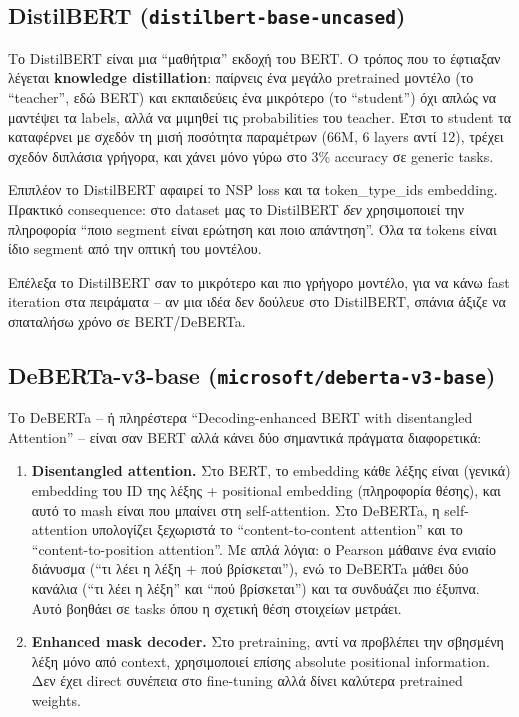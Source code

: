 \documentclass[12pt]{fphw}
\begin{document}
\subsection{DistilBERT (\texttt{distilbert-base-uncased})}

Το DistilBERT \cite{sanh2019distilbert} είναι μια ``μαθήτρια'' εκδοχή του BERT. Ο τρόπος που το έφτιαξαν λέγεται \textbf{knowledge distillation}: παίρνεις ένα μεγάλο pretrained μοντέλο (το ``teacher'', εδώ BERT) και εκπαιδεύεις ένα μικρότερο (το ``student'') όχι απλώς να μαντέψει τα labels, αλλά να μιμηθεί τις probabilities του teacher. Έτσι το student τα καταφέρνει με σχεδόν τη μισή ποσότητα παραμέτρων (66M, 6 layers αντί 12), τρέχει σχεδόν διπλάσια γρήγορα, και χάνει μόνο γύρω στο 3\% accuracy σε generic tasks.

Επιπλέον το DistilBERT αφαιρεί το NSP loss και τα token\_type\_ids embedding. Πρακτικό consequence: στο dataset μας το DistilBERT \emph{δεν} χρησιμοποιεί την πληροφορία ``ποιο segment είναι ερώτηση και ποιο απάντηση''. Όλα τα tokens είναι ίδιο segment από την οπτική του μοντέλου.

Επέλεξα το DistilBERT σαν το μικρότερο και πιο γρήγορο μοντέλο, για να κάνω fast iteration στα πειράματα -- αν μια ιδέα δεν δούλευε στο DistilBERT, σπάνια άξιζε να σπαταλήσω χρόνο σε BERT/DeBERTa.

\subsection{DeBERTa-v3-base (\texttt{microsoft/deberta-v3-base})}

Το DeBERTa \cite{he2021deberta} -- ή πληρέστερα ``Decoding-enhanced BERT with disentangled Attention'' -- είναι σαν BERT αλλά κάνει δύο σημαντικά πράγματα διαφορετικά:

\begin{enumerate}
    \item \textbf{Disentangled attention.} Στο BERT, το embedding κάθε λέξης είναι (γενικά) embedding του ID της λέξης + positional embedding (πληροφορία θέσης), και αυτό το mash είναι που μπαίνει στη self-attention. Στο DeBERTa, η self-attention υπολογίζει ξεχωριστά το ``content-to-content attention'' και το ``content-to-position attention''. Με απλά λόγια: ο Pearson μάθαινε ένα ενιαίο διάνυσμα (``τι λέει η λέξη + πού βρίσκεται''), ενώ το DeBERTa μάθει δύο κανάλια (``τι λέει η λέξη'' και ``πού βρίσκεται'') και τα συνδυάζει πιο έξυπνα. Αυτό βοηθάει σε tasks όπου η σχετική θέση στοιχείων μετράει.
    \item \textbf{Enhanced mask decoder.} Στο pretraining, αντί να προβλέπει την σβησμένη λέξη μόνο από context, χρησιμοποιεί επίσης absolute positional information. Δεν έχει direct συνέπεια στο fine-tuning αλλά δίνει καλύτερα pretrained weights.
\end{enumerate}
\end{document}
